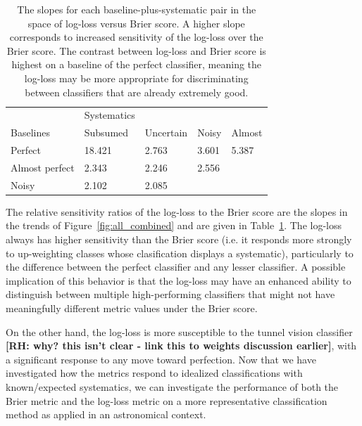 

\begin{table}[]
\begin{tabular}{l|llll}
	& Systematics & & &\\
Baselines & Subsumed & Uncertain & Noisy & Almost\\
\hline
Perfect & 18.421 & 2.763 & 3.601 & 5.387\\
Almost perfect & 2.343 & 2.246 & 2.556 & \\
Noisy & 2.102 & 2.085 & &
\end{tabular}
\caption{
The slopes for each baseline-plus-systematic pair in the space of log-loss versus Brier score.
A higher slope corresponds to increased sensitivity of the log-loss over the Brier score.
The contrast between log-loss and Brier score is highest on a baseline of the perfect classifier, meaning the log-loss may be more appropriate for discriminating between classifiers that are already extremely good.
}
\label{tab:slopes}
\end{table}

The relative sensitivity ratios of the log-loss to the Brier score are the slopes in the trends of Figure~\ref{fig:all_combined} and are given in Table~\ref{tab:slopes}.
The log-loss always has higher sensitivity than the Brier score (i.e. it responds more strongly to up-weighting classes whose clasification displays a systematic), particularly to the difference between the perfect classifier and any lesser classifier.
A possible implication of this behavior is that the log-loss may have an enhanced ability to distinguish between multiple high-performing classifiers that might not have meaningfully different metric values under the Brier score.

On the other hand, the log-loss is more susceptible to the tunnel vision classifier \textbf{[RH: why? this isn't clear - link this to weights discussion earlier]}, with a significant response to any move toward perfection.
Now that we have investigated how the metrics respond to idealized classifications with known/expected systematics, we can investigate the performance of both the Brier metric and the log-loss metric on a more representative classification method as applied in an astronomical context.

